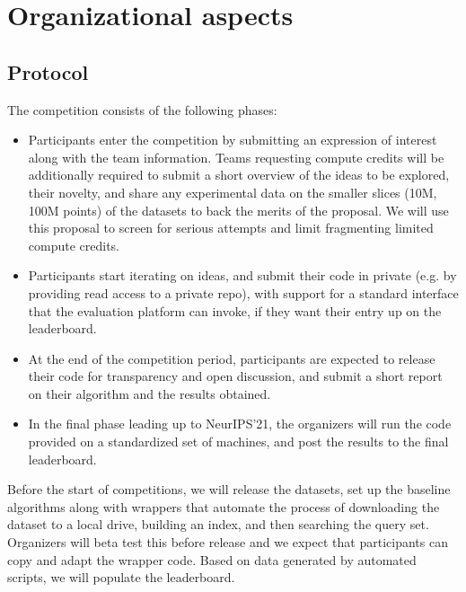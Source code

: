 


\section{Organizational aspects}
\subsection{Protocol}





The competition consists of the following phases:
\begin{itemize}
\item Participants enter the competition by submitting an expression
  of interest along with the team information. Teams requesting
  compute credits will be additionally required to submit a short
  overview of the ideas to be explored, their novelty, and share any
  experimental data on the smaller slices (10M, 100M points) of the
  datasets to back the merits of the proposal. We will use this
  proposal to screen for serious attempts and limit fragmenting
  limited compute credits.
\item Participants start iterating on ideas, and submit their code in private
  (e.g. by providing read access to a private repo), with support for
  a standard interface that the evaluation platform can invoke, if
  they want their entry up on the leaderboard.
\item At the end of the competition period, participants are expected
  to release their code for transparency and open discussion, and
  submit a short report on their algorithm and the results obtained.
\item In the final phase leading up to NeurIPS'21, the organizers will
  run the code provided on a standardized set of machines, and post
  the results to the final leaderboard.
\end{itemize}

Before the start of competitions, we will release the datasets, set up
the baseline algorithms along with wrappers that automate the process
of downloading the dataset to a local drive, building an index, and
then searching the query set. Organizers will beta test this before
release and we expect that participants can copy and adapt the wrapper
code.  Based on data generated by automated scripts, we will populate
the leaderboard.


